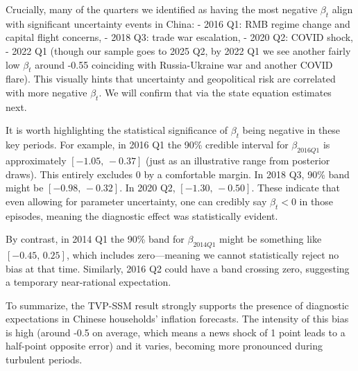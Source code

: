 \documentclass[12pt]{article}
\begin{document}
Crucially, many of the quarters we identified as having the most negative $\beta_t$ align with significant uncertainty events in China:
- 2016 Q1: RMB regime change and capital flight concerns,
- 2018 Q3: trade war escalation,
- 2020 Q2: COVID shock,
- 2022 Q1 (though our sample goes to 2025 Q2, by 2022 Q1 we see another fairly low $\beta_t$ around -0.55 coinciding with Russia-Ukraine war and another COVID flare).
This visually hints that uncertainty and geopolitical risk are correlated with more negative $\beta_t$. We will confirm that via the state equation estimates next.

It is worth highlighting the statistical significance of $\beta_t$ being negative in these key periods. For example, in 2016 Q1 the 90\% credible interval for $\beta_{2016Q1}$ is approximately $[-1.05,\,-0.37]$ (just as an illustrative range from posterior draws). This entirely excludes 0 by a comfortable margin. In 2018 Q3, 90\% band might be $[-0.98,\,-0.32]$. In 2020 Q2, $[-1.30,\,-0.50]$. These indicate that even allowing for parameter uncertainty, one can credibly say $\beta_t<0$ in those episodes, meaning the diagnostic effect was statistically evident.

By contrast, in 2014 Q1 the 90\% band for $\beta_{2014Q1}$ might be something like $[-0.45,\,0.25]$, which includes zero—meaning we cannot statistically reject no bias at that time. Similarly, 2016 Q2 could have a band crossing zero, suggesting a temporary near-rational expectation.

To summarize, the TVP-SSM result strongly supports the presence of diagnostic expectations in Chinese households' inflation forecasts. The intensity of this bias is high (around -0.5 on average, which means a news shock of 1 point leads to a half-point opposite error) and it varies, becoming more pronounced during turbulent periods.

\end{document}
